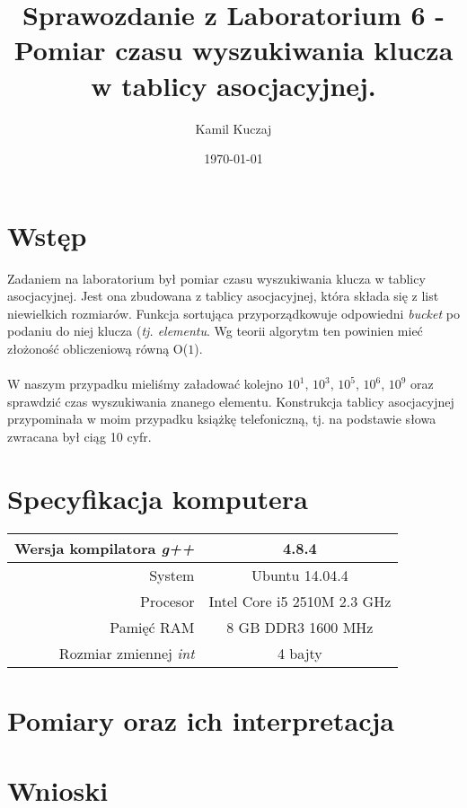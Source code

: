 \documentclass[11pt,a4paper]{article}
\author{Kamil Kuczaj}
\title{Sprawozdanie z Laboratorium 6 - Pomiar czasu wyszukiwania klucza w tablicy asocjacyjnej.}
\date{\today}
\begin{document}
\maketitle

\section{Wstęp}
\hspace{4ex}Zadaniem na laboratorium był pomiar czasu wyszukiwania klucza w tablicy asocjacyjnej. Jest ona zbudowana z tablicy asocjacyjnej, która składa się z list niewielkich rozmiarów. Funkcja sortująca przyporządkowuje odpowiedni \textit{bucket} po podaniu do niej klucza (\textit{tj. elementu}. Wg teorii algorytm ten powinien mieć złożoność obliczeniową równą O($1$).\\\\W naszym przypadku mieliśmy załadować kolejno $10^1$, $10^3$, $10^5$, $10^6$, $10^9$ oraz sprawdzić czas wyszukiwania znanego elementu. Konstrukcja tablicy asocjacyjnej przypominała w moim przypadku książkę telefoniczną, tj. na podstawie słowa zwracana był ciąg 10 cyfr.

\section{Specyfikacja komputera}

\begin{center}
	\begin{tabular}{| r | c |}
	\hline
	Wersja kompilatora \textit{g++} & 4.8.4 \\ \hline
	System & Ubuntu 14.04.4 \\ \hline
	Procesor	 & Intel Core i5 2510M 2.3 GHz \\ \hline
	Pamięć RAM & 8 GB DDR3 1600 MHz \\ \hline
	Rozmiar zmiennej \textit{int} & 4 bajty \\ \hline
	\end{tabular}
\end{center}
\newpage	

\section{Pomiary oraz ich interpretacja}

\section{Wnioski}
\hspace{4ex}
\end{document}
